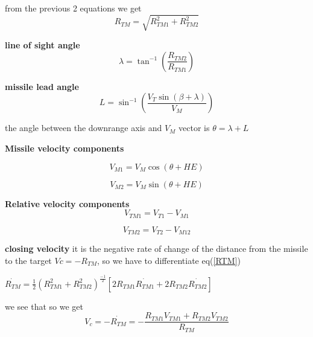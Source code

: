 from the previous 2 equations we get
\begin{equation}
R_{TM} = \sqrt{R_{TM1}^2 + R_{TM2}^2}
\label{RTM}
\end{equation}

\textbf{line of sight angle}
\begin{equation}
\lambda = \tan^{-1} (\dfrac{R_{TM2}}{R_{TM1}})
\label{lambda}
\end{equation}

\textbf{missile lead angle} 
\begin{equation}
L= \sin^{-1}(\dfrac{V_T \sin(\beta + \lambda)}{V_M})
\end{equation}

the angle between the downrange axis and $V_M$ vector is $\theta = \lambda + L$

\textbf{Missile velocity components} 

\begin{equation}
V_{M1} = V_M \cos (\theta + HE)
\end{equation}

\begin{equation}
V_{M2} = V_M \sin (\theta + HE)
\end{equation}

\textbf{Relative velocity components}
\begin{equation}
V_{TM1} = V_{T1} - V_{M1}
\end{equation}

\begin{equation}
V_{TM2} = V_{T2} - V_{M12}
\end{equation}


\textbf{closing velocity} it is the negative rate of change of the distance
from the missile to the target $Vc= -R_{TM} $, so we have to differentiate eq(\ref{RTM})

\begin{center}
	$\dot{R_{TM}}= \frac{1}{2} (R_{TM1}^2 + R_{TM2}^2)^{\frac{-1}{2}} [2 R_{TM1} \dot{R_{TM1}} + 2 R_{TM2} \dot{R_{TM2}}]$
\end{center}

we see that
so we get 
\begin{equation}
V_c = - \dot{R_{TM}} = - \dfrac{R_{TM1} V_{TM1}+R_{TM2} V_{TM2}}{R_{TM}}
\end{equation}

